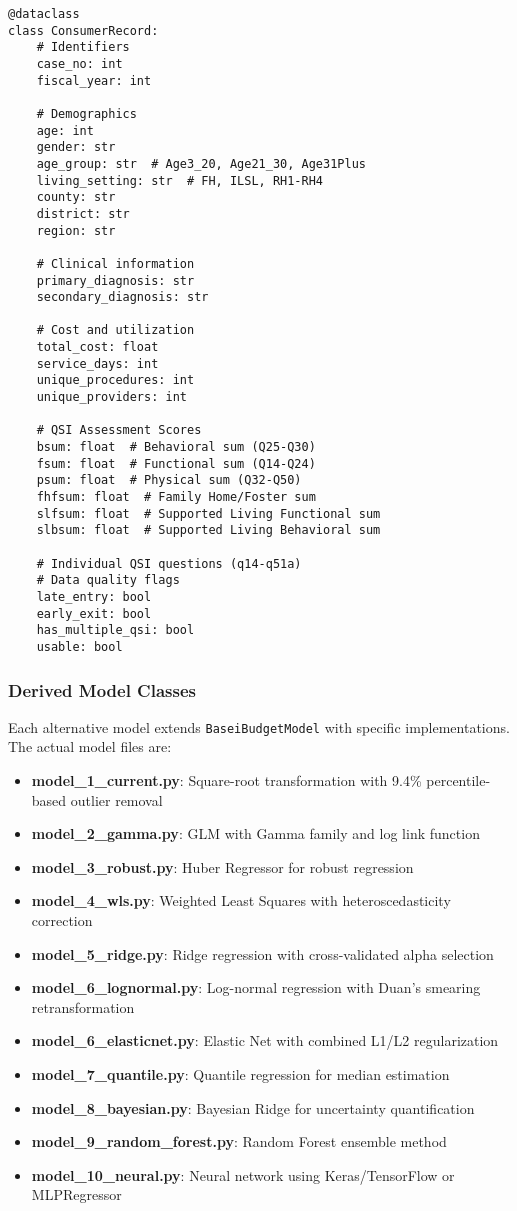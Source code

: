 \begin{verbatim}
@dataclass
class ConsumerRecord:
    # Identifiers
    case_no: int
    fiscal_year: int
    
    # Demographics
    age: int
    gender: str
    age_group: str  # Age3_20, Age21_30, Age31Plus
    living_setting: str  # FH, ILSL, RH1-RH4
    county: str
    district: str
    region: str
    
    # Clinical information
    primary_diagnosis: str
    secondary_diagnosis: str
    
    # Cost and utilization
    total_cost: float
    service_days: int
    unique_procedures: int
    unique_providers: int
    
    # QSI Assessment Scores
    bsum: float  # Behavioral sum (Q25-Q30)
    fsum: float  # Functional sum (Q14-Q24)
    psum: float  # Physical sum (Q32-Q50)
    fhfsum: float  # Family Home/Foster sum
    slfsum: float  # Supported Living Functional sum
    slbsum: float  # Supported Living Behavioral sum
    
    # Individual QSI questions (q14-q51a)
    # Data quality flags
    late_entry: bool
    early_exit: bool
    has_multiple_qsi: bool
    usable: bool
\end{verbatim}

\subsubsection{Derived Model Classes}

Each alternative model extends \texttt{BaseiBudgetModel} with specific implementations. The actual model files are:

\begin{itemize}
    \item \textbf{model\_1\_current.py}: Square-root transformation with 9.4\% percentile-based outlier removal
    \item \textbf{model\_2\_gamma.py}: GLM with Gamma family and log link function
    \item \textbf{model\_3\_robust.py}: Huber Regressor for robust regression
    \item \textbf{model\_4\_wls.py}: Weighted Least Squares with heteroscedasticity correction
    \item \textbf{model\_5\_ridge.py}: Ridge regression with cross-validated alpha selection
    \item \textbf{model\_6\_lognormal.py}: Log-normal regression with Duan's smearing retransformation
    \item \textbf{model\_6\_elasticnet.py}: Elastic Net with combined L1/L2 regularization
    \item \textbf{model\_7\_quantile.py}: Quantile regression for median estimation
    \item \textbf{model\_8\_bayesian.py}: Bayesian Ridge for uncertainty quantification
    \item \textbf{model\_9\_random\_forest.py}: Random Forest ensemble method
    \item \textbf{model\_10\_neural.py}: Neural network using Keras/TensorFlow or MLPRegressor
\end{itemize}

